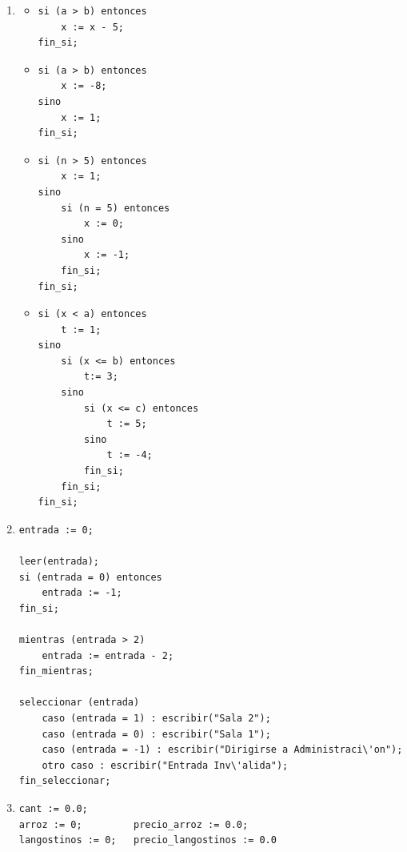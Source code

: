 \documentclass[a4paper,10pt]{article}
\begin{document}
\begin{enumerate}
\item[5]
    \begin{itemize}
        \item[a-]
            \begin{small}
\begin{verbatim}
si (a > b) entonces
    x := x - 5;
fin_si;
\end{verbatim}
            \end{small}        
        \item[b-]
            \begin{small}
\begin{verbatim}
si (a > b) entonces
    x := -8;
sino
    x := 1;
fin_si;
\end{verbatim}
            \end{small}        
        \item[c-]
            \begin{small}
\begin{verbatim}
si (n > 5) entonces
    x := 1;
sino 
    si (n = 5) entonces
        x := 0;
    sino
        x := -1;
    fin_si;
fin_si;
\end{verbatim}
            \end{small}        
        \item[d-]
            \begin{small}
\begin{verbatim}
si (x < a) entonces
    t := 1;
sino 
    si (x <= b) entonces
        t:= 3;
    sino
        si (x <= c) entonces
            t := 5;
        sino 
            t := -4;
        fin_si;
    fin_si;
fin_si;
\end{verbatim}
            \end{small}    
    \end{itemize}

\item[7]
            \begin{small}
\begin{verbatim}
entrada := 0;

leer(entrada);
si (entrada = 0) entonces
    entrada := -1;
fin_si;

mientras (entrada > 2)
    entrada := entrada - 2;
fin_mientras;

seleccionar (entrada)
    caso (entrada = 1) : escribir("Sala 2");
    caso (entrada = 0) : escribir("Sala 1");
    caso (entrada = -1) : escribir("Dirigirse a Administraci\'on");
    otro caso : escribir("Entrada Inv\'alida");
fin_seleccionar;
\end{verbatim}
            \end{small}
\item[9]
            \begin{small}
\begin{verbatim}
cant := 0.0;
arroz := 0;         precio_arroz := 0.0;
langostinos := 0;   precio_langostinos := 0.0


\end{verbatim}
\end{small}
\end{enumerate}
\end{document}
